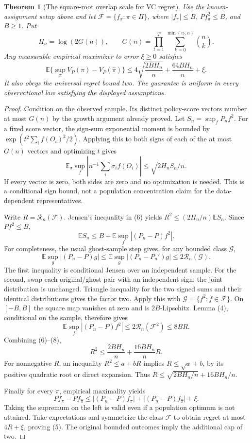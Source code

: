 \documentclass[11pt]{article}
\newtheorem{theorem}{Theorem}
\theoremstyle{definition}
\begin{document}
\begin{theorem}[The square-root overlap scale for VC regret]
Use the known-assignment setup above and let
$\mathcal F=\{f_\pi:\pi\in\Pi\}$, where $|f_\pi|\le B$,
$P f_\pi^2\le B$, and $B\ge1$. Put
\[
 H_n=\log(2G(n)),\qquad
 G(n)=\prod_{t=1}^T\sum_{k=0}^{\min(v_t,n)}\binom nk.
\]
Any measurable empirical maximizer to error $\xi\ge0$ satisfies
\[
 \mathbb E\{\sup_\pi V_P(\pi)-V_P(\widehat\pi)\}
 \le 4\sqrt{\frac{2B H_n}{n}}+
                         \frac{64B H_n}{n}+\xi.       \tag{5}
\]
It also obeys the universal regret bound two. The guarantee is uniform
in every observational law satisfying the displayed assumptions.
\end{theorem}
\begin{proof}
Condition on the observed sample. Its distinct policy-score vectors
number at most $G(n)$ by the growth argument already proved. Let
$S_n=\sup_f P_n f^2$. For a fixed score vector, the sign-sum exponential
moment is bounded by
$\exp(t^2\sum_i f(O_i)^2/2)$. Applying this to both signs of each
of the at most $G(n)$ vectors and optimizing $t$ gives
\[
 \mathbb E_\sigma\sup_f\left|n^{-1}\sum_i\sigma_i f(O_i)\right|
 \le\sqrt{2H_n S_n/n}.                              \tag{6}
\]
If every vector is zero, both sides are zero and no optimization is
needed. This is a conditional sign bound, not a population concentration
claim for the data-dependent representatives.

Write $R=\mathcal R_n(\mathcal F)$. Jensen's inequality in (6) yields
$R^2\le (2H_n/n)\mathbb E S_n$. Since $P f^2\le B$,
\[
 \mathbb E S_n\le B+
                   \mathbb E\sup_f|(P_n-P)f^2|.       \tag{7}
\]
For completeness, the usual ghost-sample step gives, for any bounded
class $\mathcal G$,
\[
 \mathbb E\sup_g|(P_n-P)g|
 \le\mathbb E\sup_g|(P_n-P_n')g|
 \le2\mathcal R_n(\mathcal G).
\]
The first inequality is conditional Jensen over an independent sample.
For the second, swap each original/ghost pair with an independent sign;
the joint distribution is unchanged. Triangle inequality for the two
signed sums and their identical distributions gives the factor two.
Apply this with $\mathcal G=\{f^2:f\in\mathcal F\}$.
On $[-B,B]$ the square map vanishes at zero and is $2B$-Lipschitz.
Lemma (4), conditional on the sample, therefore gives
\[
 \mathbb E\sup_f|(P_n-P)f^2|
 \le2\mathcal R_n(\mathcal F^2)\le8BR.                \tag{8}
\]
Combining (6)--(8),
\[
 R^2\le\frac{2BH_n}{n}+\frac{16BH_n}{n}R.
\]
For nonnegative $R$, an inequality $R^2\le a+bR$ implies
$R\le\sqrt a+b$, by its positive quadratic root or direct expansion.
Thus $R\le\sqrt{2BH_n/n}+16BH_n/n$.

Finally for every $\pi$, empirical maximality yields
\[
 Pf_\pi-Pf_{\widehat\pi}
 \le |(P_n-P)f_\pi|+|(P_n-P)f_{\widehat\pi}|+\xi.
\]
Taking the supremum on the left is valid even if a population optimum
is not attained. Take expectations and symmetrize the class
$\mathcal F$ to obtain regret at most $4R+\xi$, proving (5).
The original bounded outcomes imply the additional cap of two.
\end{proof}
\end{document}
